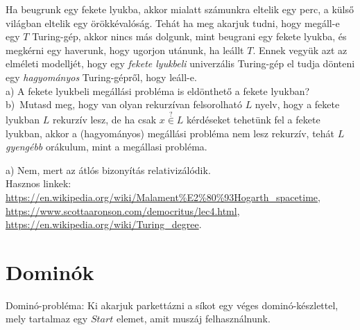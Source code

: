 \begin{Exercise}[counter={sorszam}, difficulty=0]
	Ha beugrunk egy fekete lyukba, akkor mialatt sz\'amunkra eltelik egy perc, a k\"uls\H o vil\'agban eltelik egy \"or\"okk\'eval\'os\'ag. Teh\'at ha meg akarjuk tudni, hogy meg\'all-e egy $T$ Turing-g\'ep, akkor nincs m\'as dolgunk, mint beugrani egy fekete lyukba, \'es megk\'erni egy haverunk, hogy ugorjon ut\'anunk, ha le\'allt $T$. Ennek vegy\"uk azt az elm\'eleti modellj\'et, hogy egy \emph{fekete lyukbeli} univerz\'alis Turing-g\'ep el tudja d\"onteni egy \emph{hagyom\'anyos} Turing-g\'epr\H ol, hogy le\'all-e.\\
	a) A fekete lyukbeli meg\'all\'asi probl\'ema is eld\"onthet\H o a fekete lyukban?\\
	b)~\veryhard Mutasd meg, hogy van olyan rekurz\'ivan felsorolhat\'o $L$ nyelv, hogy a fekete lyukban $L$ rekurz\'iv lesz, de ha csak $x \stackrel ?\in L$ k\'erd\'eseket tehet\"unk fel a fekete lyukban, akkor a (hagyom\'anyos) meg\'all\'asi probl\'ema nem lesz rekurz\'iv, teh\'at $L$ \emph{gyeng\'ebb} or\'akulum, mint a meg\'allasi probl\'ema.
\end{Exercise}	
\begin{Answer}
	a) Nem, mert az \'atl\'os bizony\'it\'as relativiz\'al\'odik.\\
	Hasznos linkek: \url{https://en.wikipedia.org/wiki/Malament%E2%80%93Hogarth_spacetime}, \url{https://www.scottaaronson.com/democritus/lec4.html}, \url{https://en.wikipedia.org/wiki/Turing_degree}.
	\end{Answer}
	
	
	\section{Domin\'ok}
	\bigskip
	 Dominó-probléma: Ki akarjuk parkettázni a síkot egy véges dominó-készlettel, mely tartalmaz egy $Start$ elemet, amit muszáj felhasználnunk.
	
